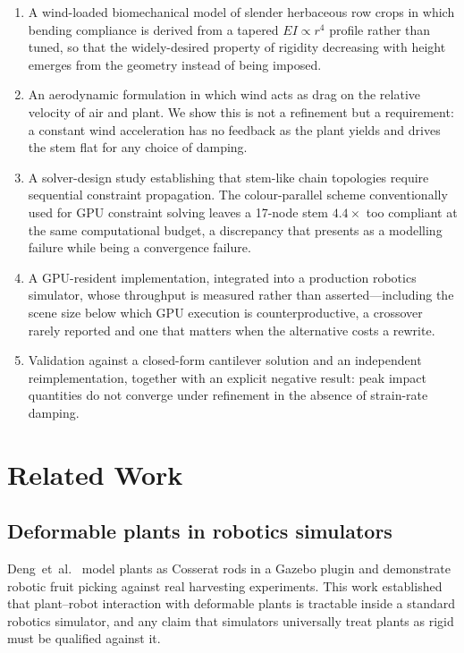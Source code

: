 \documentclass[conference]{IEEEtran}
\begin{document}
\begin{enumerate}
\item A wind-loaded biomechanical model of slender herbaceous row crops in
which bending compliance is derived from a tapered $EI \propto r^4$ profile
rather than tuned, so that the widely-desired property of rigidity decreasing
with height emerges from the geometry instead of being imposed.

\item An aerodynamic formulation in which wind acts as drag on the relative
velocity of air and plant. We show this is not a refinement but a requirement:
a constant wind acceleration has no feedback as the plant yields and drives
the stem flat for any choice of damping.

\item A solver-design study establishing that stem-like chain topologies
require sequential constraint propagation. The colour-parallel scheme
conventionally used for GPU constraint solving leaves a 17-node stem
$4.4\times$ too compliant at the same computational budget, a discrepancy that
presents as a modelling failure while being a convergence failure.

\item A GPU-resident implementation, integrated into a production robotics
simulator, whose throughput is measured rather than asserted---including the
scene size below which GPU execution is counterproductive, a crossover rarely
reported and one that matters when the alternative costs a rewrite.

\item Validation against a closed-form cantilever solution and an independent
reimplementation, together with an explicit negative result: peak impact
quantities do not converge under refinement in the absence of strain-rate
damping.
\end{enumerate}

\section{Related Work}
\label{sec:related}

\subsection{Deformable plants in robotics simulators}

Deng~et~al.~\cite{deng2024gazeboplants} model plants as Cosserat rods in a
Gazebo plugin and demonstrate robotic fruit picking against real harvesting
experiments. This work established that plant--robot interaction with
deformable plants is tractable inside a standard robotics simulator, and any
claim that simulators universally treat plants as rigid must be qualified
against it.
\end{document}
